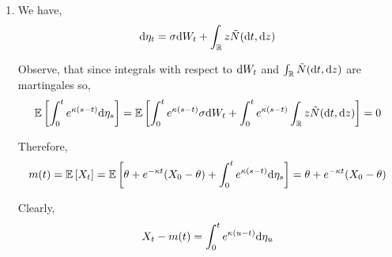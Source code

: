 \begin{solution}[Solution]
\begin{enumerate}[label=(\alph*)]
        
    \item
        We have,
        \begin{align*}
            \mathrm{d} \eta_t = \sigma \mathrm{d} W_t + \int_{\mathbb{R}} z \tilde{N}(\mathrm{d} t, \mathrm{d} z)
        \end{align*}
       
        Observe, that since integrals with respect to \( \mathrm{d} W_t \) and \( \int_{\mathbb{R}} \tilde{N}(\mathrm{d} t, \mathrm{d} z) \) are martingales so,
        \begin{align*}
            \mathbb{E} \left[ \int_{0}^{t} e^{\kappa(s-t)} \mathrm{d} \eta_s \right]
            = \mathbb{E} \left[ \int_{0}^{t} e^{\kappa(s-t)} \sigma \mathrm{d} W_t + \int_{0}^{t} e^{\kappa(s-t)} \int_{\mathbb{R}} z \tilde{N}(\mathrm{d} t, \mathrm{d} z) \right] = 0
        \end{align*}
        
        Therefore,
        \begin{align*}
            m(t) = \mathbb{E} \left[ X_t \right]
            = \mathbb{E} \left[ \theta + e^{-\kappa t}(X_0 - \theta) + \int_{0}^{t} e^{\kappa(s-t)} \mathrm{d} \eta_s \right]
            = \theta + e^{-\kappa t}(X_0 - \theta)
        \end{align*}
        

        Clearly,
        \begin{align*}
            X_t - m(t) = \int_{0}^{t}e^{\kappa(u-t)} \mathrm{d} \eta_u
        \end{align*}

        \iffalse
        Observe,
        \begin{align*}
            \EE[\d\eta_u \d\eta_v]
            &= \EE \left[ \sigma^2 \d W_u \d W_v + \d W_u \int_{\RR} z \tilde{N}(\d v, \d z) + \d W_v \int_{\RR} y \tilde{N} (\d u, \d y) + \iint_{\RR^2} y z \tilde{N}(\d u, \d u) \tilde{N} (\d v, \d z)  \right]
            \\&= \EE \left[ \sigma^2 \d W_u \d W_v \right] + \EE\left[\int_{\RR} z \d W_u \tilde{N}(\d v, \d z) \right] 
            \\& \hspace{5em} + \EE\left [ \int_{\RR} y \d W_v \tilde{N} (\d u, \d y)\right] + \EE \left[\iint_{\RR^2} y z \tilde{N}(\d u, \d y) \tilde{N} (\d v, \d z)  \right]
            \\&= \sigma^2 \delta_{u,v} \d u + 0 + 0 + \iint_{\RR^2}\delta_{u,v} \delta(z-y) N(\d u, \d z)\d y
        \end{align*}
        \fi


\end{enumerate}
\end{solution}
